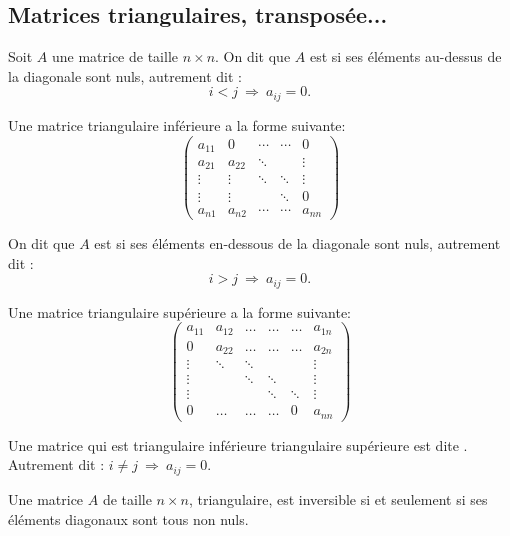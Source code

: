 \documentclass[10pt,class=article,crop=false]{standalone}
\begin{document}
\begin{multicols}{2}
\subsection{Matrices triangulaires, transposée...}


Soit $A$ une matrice de taille $n \times n$. On dit que $A$ est 
si ses éléments au-dessus de la diagonale sont nuls, autrement dit :
$$
i < j \  \Longrightarrow \ a_{ij} = 0.$$

Une matrice triangulaire inférieure a la forme suivante:
$$\begin{pmatrix}
	a_{11} & 0 &\cdots&\cdots& 0\\
	a_{21}&a_{22}&\ddots&&\vdots\\
	\vdots&\vdots&\ddots&\ddots&\vdots\\
	\vdots & \vdots &&\ddots&0\\
	a_{n1}&a_{n2}&\cdots&\cdots&a_{nn}
\end{pmatrix}
$$

\bigskip

On dit que $A$ est  si ses éléments en-dessous
de la diagonale sont nuls,  autrement dit :
$$
i > j \ \Longrightarrow \ a_{ij} = 0. $$

Une matrice triangulaire supérieure a la forme suivante:
$$\begin{pmatrix}
	a_{11} & a_{12} &\dots&\dots&\dots & a_{1n}\\
	0&a_{22}&\dots&\dots&\dots&a_{2n}\\
	\vdots&\ddots&\ddots&&&\vdots\\
	\vdots&&\ddots&\ddots&&\vdots\\
	\vdots & &&\ddots&\ddots&\vdots\\
	0&\dots&\dots&\dots&0&a_{nn}
\end{pmatrix}
$$


Une matrice qui est triangulaire inférieure  triangulaire supérieure
est dite .
Autrement dit : $i\neq j \ \Longrightarrow \ a_{ij} = 0$.



\begin{theoreme}
	Une matrice $A$ de taille $n\times n$, triangulaire, est inversible
	si et seulement si ses éléments diagonaux sont tous non nuls.
\end{theoreme}




\end{multicols}
\end{document}
